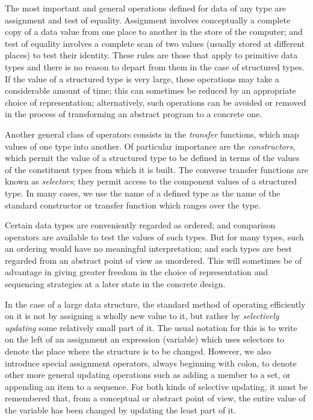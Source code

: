 \documentclass[twoside,11pt]{book}
\begin{document}
The most important and general operations defined for data of any type are assignment and test of equality. Assignment involves conceptually a complete copy of a data value from one place to another in the store of the computer; and test of equality involves a complete scan of two values (usually stored at different places) to test their identity. These rules are those that apply to primitive data types and there is no reason to depart from them in the case of structured types. If the value of a structured type is very large, these operations may take a considerable amount of time; this can sometimes be reduced by an appropriate choice of representation; alternatively, such operations can be avoided or removed in the process of transforming an abstract program to a concrete one.

Another general class of operators consists in the \textit{transfer} functions, which map values of one type into another. Of particular importance are the \textit{constructors}, which permit the value of a structured type to be defined in terms of the values of the constituent types from which it is built. The converse transfer functions are known as \textit{selectors}; they permit access to the component values of a structured type. In many cases, we use the name of a defined type as the name of the standard constructor or transfer function which ranges over the type.

Certain data types are conveniently regarded as ordered; and comparison operators are available to test the values of such types. But for many types, such an ordering would have no meaningful interpretation; and such types are best regarded from an abstract point of view as unordered. This will sometimes be of advantage in giving greater freedom in the choice of representation and sequencing strategies at a later state in the concrete design.

In the case of a large data structure, the standard method of operating efficiently on it is not by assigning a wholly new value to it, but rather by \textit{selectively updating} some relatively small part of it. The usual notation for this is to write on the left of an assignment an expression (variable) which uses selectors to denote the place where the structure is to be changed. However, we also introduce special assignment operators, always beginning with colon, to denote other more general updating operations such as adding a member to a set, or appending an item to a sequence. For both kinds of selective updating, it must be remembered that, from a conceptual or abstract point of view, the entire value of the variable has been changed by updating the least part of it.
\end{document}
